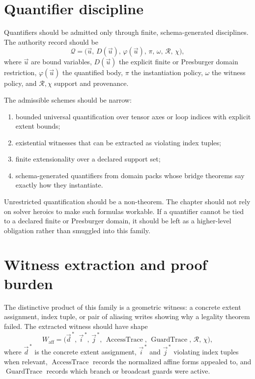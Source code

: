 \documentclass[11pt]{report}
\begin{document}
\section{Quantifier discipline}
Quantifiers should be admitted only through finite, schema-generated disciplines. The authority record should be
\[
\mathcal{Q}
=
\bigl(
\vec{u},\,
D(\vec{u}),\,
\varphi(\vec{u}),\,
\pi,\,
\omega,\,
\mathcal{R},\,
\chi
\bigr),
\]
where $\vec{u}$ are bound variables, $D(\vec{u})$ the explicit finite or Presburger domain restriction, $\varphi(\vec{u})$ the quantified body, $\pi$ the instantiation policy, $\omega$ the witness policy, and $\mathcal{R},\chi$ support and provenance.

The admissible schemes should be narrow:
\begin{enumerate}
\item bounded universal quantification over tensor axes or loop indices with explicit extent bounds;
\item existential witnesses that can be extracted as violating index tuples;
\item finite extensionality over a declared support set;
\item schema-generated quantifiers from domain packs whose bridge theorems say exactly how they instantiate.
\end{enumerate}

Unrestricted quantification should be a non-theorem. The chapter should not rely on solver heroics to make such formulas workable. If a quantifier cannot be tied to a declared finite or Presburger domain, it should be left as a higher-level obligation rather than smuggled into this family.
\section{Witness extraction and proof burden}
The distinctive product of this family is a geometric witness: a concrete extent assignment, index tuple, or pair of aliasing writes showing why a legality theorem failed. The extracted witness should have shape
\[
W_{\mathrm{aff}}
=
\bigl(
\vec{d}^{\,*},\,
\vec{i}^{\,*},\,
\vec{j}^{\,*},\,
\operatorname{AccessTrace},\,
\operatorname{GuardTrace},\,
\mathcal{R},\,
\chi
\bigr),
\]
where $\vec{d}^{\,*}$ is the concrete extent assignment, $\vec{i}^{\,*}$ and $\vec{j}^{\,*}$ violating index tuples when relevant, $\operatorname{AccessTrace}$ records the normalized affine forms appealed to, and $\operatorname{GuardTrace}$ records which branch or broadcast guards were active.
\end{document}
